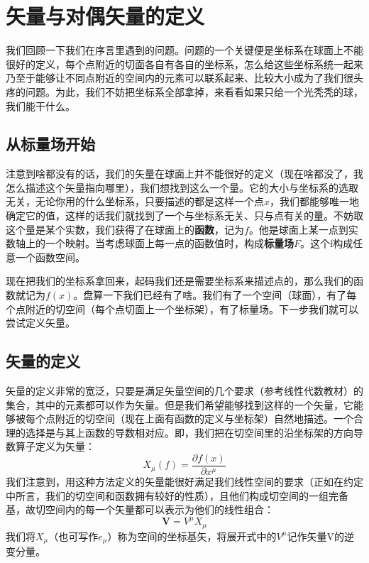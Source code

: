\documentclass[UTF-8]{article}
\begin{document}
\section{矢量与对偶矢量的定义}
我们回顾一下我们在序言里遇到的问题。问题的一个关键便是坐标系在球面上不能很好的定义，每个点附近的切面各自有各自的坐标系，怎么给这些坐标系统一起来乃至于能够让不同点附近的空间内的元素可以联系起来、比较大小成为了我们很头疼的问题。为此，我们不妨把坐标系全部拿掉，来看看如果只给一个光秃秃的球，我们能干什么。


\subsection{从标量场开始}
注意到啥都没有的话，我们的矢量在球面上并不能很好的定义（现在啥都没了，我怎么描述这个矢量指向哪里），我们想找到这么一个量。它的大小与坐标系的选取无关，无论你用的什么坐标系，只要描述的都是这样一个点$x$，我们都能够唯一地确定它的值，这样的话我们就找到了一个与坐标系无关、只与点有关的量。不妨取这个量是某个实数，我们获得了在球面上的\textbf{函数}，记为$f$。他是球面上某一点到实数轴上的一个映射。当考虑球面上每一点的函数值时，构成\textbf{标量场}$F$。这个f构成任意一个函数空间。

现在把我们的坐标系拿回来，起码我们还是需要坐标系来描述点的，那么我们的函数就记为$f(x)$。盘算一下我们已经有了啥。我们有了一个空间（球面），有了每个点附近的切空间（每个点切面上一个坐标架），有了标量场。下一步我们就可以尝试定义矢量。


\subsection{矢量的定义}
矢量的定义非常的宽泛，只要是满足矢量空间的几个要求（参考线性代数教材）的集合，其中的元素都可以作为矢量。但是我们希望能够找到这样的一个矢量，它能够被每个点附近的切空间（现在上面有函数的定义与坐标架）自然地描述。一个合理的选择是与其上函数的导数相对应。即，我们把在切空间里的沿坐标架的方向导数算子定义为矢量：
\begin{equation}
	X_{\mu} (f) = \frac{\partial f(x)}{\partial x^{\mu}}
\end{equation}
我们注意到，用这种方法定义的矢量能很好满足我们线性空间的要求（正如在约定中所言，我们的切空间和函数拥有较好的性质），且他们构成切空间的一组完备基，故切空间内的每一个矢量都可以表示为他们的线性组合：
\begin{equation}
	\mathbf{V} = V^{\mu} X_{\mu}
\end{equation}
我们将$X_{\mu}$（也可写作$e_{\mu}$）称为空间的坐标基矢，将展开式中的$V^{\mu}$记作矢量V的逆变分量。
\end{document}
